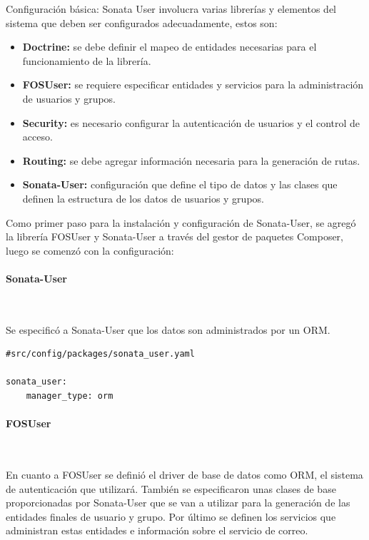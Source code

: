 Configuración básica: Sonata User involucra varias librerías y elementos del sistema que deben ser configurados adecuadamente, estos son:

\begin{itemize}
    \item \textbf{Doctrine:} se debe definir el mapeo de entidades necesarias para el funcionamiento de la librería.
    \item \textbf{FOSUser:} se requiere especificar entidades y servicios para la administración de usuarios y grupos.
    \item \textbf{Security:} es necesario configurar la autenticación de usuarios y el control de acceso.
    \item \textbf{Routing:} se debe agregar información necesaria para la generación de rutas.
    \item \textbf{Sonata-User:} configuración que define el tipo de datos y las clases que definen la estructura de los datos de usuarios y grupos.
\end{itemize}



Como primer paso para la instalación y configuración de Sonata-User, se agregó la librería FOSUser y Sonata-User a través del gestor de paquetes Composer,
luego se comenzó con la configuración:

\paragraph{Sonata-User}~\newline

Se especificó a Sonata-User que los datos son administrados por un ORM.

\begin{lstlisting}[caption={archivo de configuración de sonata-user\\Fuente: \sonatainstallation.}]
#src/config/packages/sonata_user.yaml

sonata_user:
    manager_type: orm

\end{lstlisting}

\paragraph{FOSUser}~\newline

En cuanto a FOSUser se definió el driver de base de datos como ORM, el sistema de autenticación que utilizará\@. También se especificaron unas clases de base
proporcionadas por Sonata-User que se van a utilizar para la generación de las entidades finales de usuario y grupo\@. Por último se definen los servicios
que administran estas entidades e información sobre el servicio de correo.

